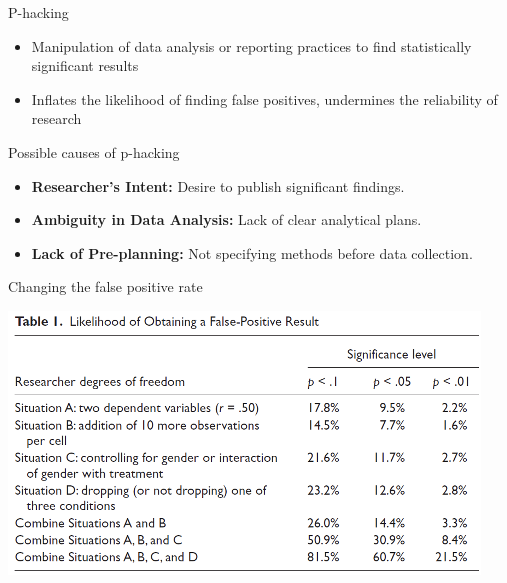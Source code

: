 \documentclass[
  ignorenonframetext,
  aspectratio=169,
]{beamer}
\providecommand{\tightlist}{%
  \setlength{\itemsep}{0pt}\setlength{\parskip}{0pt}}\usepackage{longtable,booktabs,array}
\begin{document}
\begin{frame}{P-hacking}
\label{p-hacking}
\begin{itemize}[<+->]
\tightlist
\item
  Manipulation of data analysis or reporting practices to find
  statistically significant results
\item
  Inflates the likelihood of finding false positives, undermines the
  reliability of research
\end{itemize}
\end{frame}

\begin{frame}{Possible causes of p-hacking}
\label{possible-causes-of-p-hacking}
\begin{itemize}[<+->]
\tightlist
\item
  \textbf{Researcher's Intent:} Desire to publish significant findings.
\item
  \textbf{Ambiguity in Data Analysis:} Lack of clear analytical plans.
\item
  \textbf{Lack of Pre-planning:} Not specifying methods before data
  collection.
\end{itemize}
\end{frame}

\begin{frame}{Changing the false positive rate}
\label{changing-the-false-positive-rate}
\end{frame}

\begin{frame}{\begin{center}
\includegraphics{figs/p-Hacking-table.png}
\end{center}
}
\label{section-1}
\end{frame}
\end{document}
